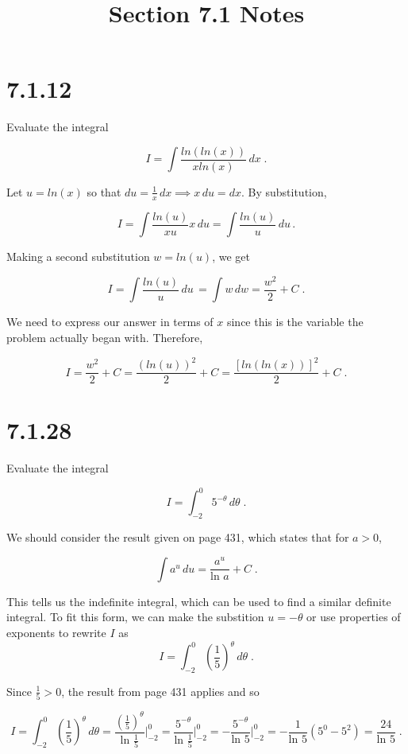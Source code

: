 \documentclass[11pt]{article}
\title{Section 7.1 Notes}
\begin{document}
\maketitle

\section*{7.1.12}

Evaluate the integral

$$I = \int \frac{ln(ln(x))}{xln(x)} \, dx \;.$$

Let $u = ln(x)$ so that $du = \frac{1}{x} \, dx \implies x \, du = dx$. By substitution,

$$I = \int \frac{ln(u)}{xu} x \, du = \int \frac{ln(u)}{u}  \, du\,.$$

Making a second substitution $w = ln(u)$, we get

$$I = \int \frac{ln(u)}{u}  \, du\, = \int w \, dw = \frac{w^2}{2}+C\;.$$

We need to express our answer in terms of $x$ since this is the variable the problem actually began with. Therefore,

$$I = \frac{w^2}{2}+C = \frac{(ln(u))^2}{2}+C = \frac{[ln(ln(x))]^2}{2}+C \;.$$

\section*{7.1.28}

Evaluate the integral

$$I = \int_{-2}^{0} 5^{-\theta} \, d\theta \;.$$

We should consider the result given on page 431, which states that for $a>0$,

$$\int a^u \, du = \frac{a^u}{\text{ln }a} + C \;.$$

This tells us the indefinite integral, which can be used to find a similar definite integral. To fit this form, we can make the substition $u = -\theta$ or use properties of exponents to rewrite $I$ as $$ I = \int_{-2}^{0} \left(\frac{1}{5}\right)^\theta \, d\theta \;.$$

Since $\frac{1}{5} > 0$, the result from page 431 applies and so

$$I = \int_{-2}^{0} \left(\frac{1}{5}\right)^\theta \, d\theta = \frac{\left(\frac{1}{5}\right)^\theta}{\text{ln } \frac{1}{5}} \big\rvert_{-2}^{0} =\frac{5^{-\theta}}{\text{ln } \frac{1}{5}}\big\rvert_{-2}^{0} = -\frac{5^{-\theta}}{\text{ln } 5}\big\rvert_{-2}^{0} = -\frac{1}{\text{ln } 5}(5^0 - 5^2) = \frac{24}{\text{ln } 5}\;.$$
\end{document}
